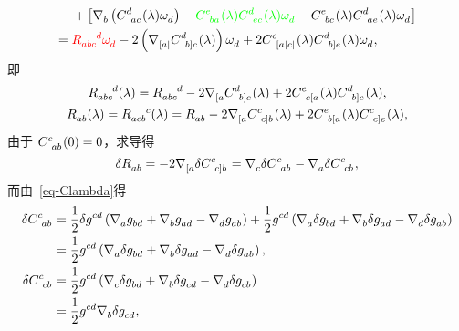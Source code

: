 \begin{Proof}
\begin{equation}
\begin{split}
					& {} + \left[ \Nabla{b} \left( \tensor{C}{^d_a_c}(\lambda) \tensor{\omega}{_d} \right) - {\color{green}\tensor{C}{^e_b_a}(\lambda) \tensor{C}{^d_e_c}(\lambda) \tensor{\omega}{_d}} - \tensor{C}{^e_b_c}(\lambda) \tensor{C}{^d_a_e}(\lambda) \tensor{\omega}{_d} \right]\\
					={} & {\color{red} \tensor{R}{_a_b_c^d} \tensor{\omega}{_d}} - 2 \left( \Nabla{{[a|}} \tensor{C}{^d_{b]}_c}(\lambda) \right) \tensor{\omega}{_d} + 2 \tensor{C}{^e_{[a}_{|c|}}(\lambda) \tensor{C}{^d_{b]}_e}(\lambda) \tensor{\omega}{_d},
				\end{split}
			\end{equation}
			即
			\begin{gather}
				\tensor{R}{_a_b_c^d}(\lambda) = \tensor{R}{_a_b_c^d} - 2 \Nabla{{[a}} \tensor{C}{^d_{b]}_c}(\lambda) + 2 \tensor{C}{^e_c_{[a}}(\lambda) \tensor{C}{^d_{b]}_e}(\lambda),\\
				\tensor{R}{_a_b}(\lambda) = \tensor{R}{_a_c_b^c}(\lambda) = \tensor{R}{_a_b} - 2 \Nabla{{[a}} \tensor{C}{^c_{c]}_b}(\lambda) + 2 \tensor{C}{^e_b_{[a}}(\lambda) \tensor{C}{^c_{c]}_e}(\lambda),
			\end{gather}
			由于 $\tensor{C}{^c_a_b}(0)=0$，求导得
			\begin{equation}
				\var{\tensor{R}{_a_b}} = - 2 \Nabla{{[a}} \var \tensor{C}{^c_{c]}_b} = \Nabla{c} \var \tensor{C}{^c_a_b} - \Nabla{a} \var \tensor{C}{^c_c_b},\label{eq-varR_varC}
			\end{equation}
			而由~\eqref{eq-Clambda}得
			\begin{equation}
				\begin{split}
					\var{\tensor{C}{^c_a_b}} &= \frac{1}{2} \var\tensor{g}{^c^d} \left( \Nabla{a} \tensor{g}{_b_d} + \Nabla{b} \tensor{g}{_a_d} - \Nabla{d} \tensor{g}{_a_b} \right) + \frac{1}{2} \tensor{g}{^c^d} \left( \Nabla{a} \var \tensor{g}{_b_d} + \Nabla{b} \var \tensor{g}{_a_d} - \Nabla{d} \var \tensor{g}{_a_b} \right)\\
					&= \frac{1}{2} \tensor{g}{^c^d} \left( \Nabla{a} \var \tensor{g}{_b_d} + \Nabla{b} \var \tensor{g}{_a_d} - \Nabla{d} \var \tensor{g}{_a_b} \right),\\
					\var{\tensor{C}{^c_c_b}} &= \frac{1}{2} \tensor{g}{^c^d} \left( \Nabla{c} \var \tensor{g}{_b_d} + \Nabla{b} \var \tensor{g}{_c_d} - \Nabla{d} \var \tensor{g}{_c_b} \right)\\
					&= \frac{1}{2} \tensor{g}{^c^d} \Nabla{b} \var \tensor{g}{_c_d},
				\end{split}
			\end{equation}

\end{Proof}
